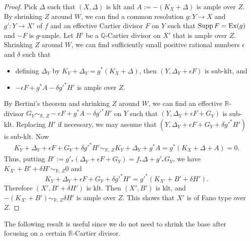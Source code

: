 \documentclass[12pt]{amsart}
\theoremstyle{definition}
\begin{document}
\begin{proof}
Pick $\Delta$ such that $(X,\Delta)$ is klt and $A:=-(K_{X}+\Delta)$ is ample over $Z$. 
By shrinking $Z$ around $W$, we can find a common resolution $g \colon Y \to X$ and $g' \colon Y \to X'$ of $f$ and an effective Cartier divisor $F$ on $Y$ such that ${\rm Supp}\,F={\rm Ex}(g)$ and $-F$ is $g$-ample. 
Let $H'$ be a $\mathbb{Q}$-Cartier divisor on $X'$ that is ample over $Z$. 
Shrinking $Z$ around $W$, we can find sufficiently small positive rational numbers $\epsilon$ and $\delta$ such that 
\begin{itemize}
\item
defining $\Delta_{Y}$ by $K_{Y}+\Delta_{Y}=g^{*}(K_{X}+\Delta)$, then $(Y,\Delta_{Y}+\epsilon F)$ is sub-klt, and 
\item
$-\epsilon F + g^{*}A-\delta g'^{*}H'$ is ample over $Z$. 
\end{itemize}
By Bertini's theorem and shrinking $Z$ around $W$, we can find an effective $\mathbb{R}$-divisor $G_{Y} \sim_{\mathbb{R},\,Z}-\epsilon F + g^{*}A-\delta g'^{*}H'$ on $Y$ such that $(Y,\Delta_{Y}+\epsilon F+G_{Y})$ is sub-klt. 
Replacing $H'$ if necessary, we may assume that $(Y,\Delta_{Y}+\epsilon F+G_{Y}+\delta g'^{*}H')$ is sub-klt. 
Now
\begin{equation*}
\begin{split}
K_{Y}+\Delta_{Y}+\epsilon F+G_{Y}+\delta g'^{*}H'\sim_{\mathbb{R},\,Z}K_{Y}+\Delta_{Y}+g^{*}A=g^{*}(K_{X}+\Delta+A) = 0.
\end{split}
\end{equation*}
Thus, putting $B':=g'_{*}(\Delta_{Y}+\epsilon F+G_{Y})=f_{*}\Delta+g'_{*}G_{Y}$, we have $K_{X'}+B'+\delta H' \sim_{\mathbb{R},\,Z}0$ and 
$$K_{Y}+\Delta_{Y}+\epsilon F+G_{Y}+\delta g'^{*}H'=g'^{*}(K_{X'}+B'+\delta H').$$ 
Therefore $(X',B'+\delta H')$ is klt. 
Then $(X',B')$ is klt, and $-(K_{X'}+B') \sim_{\mathbb{R},\,Z}\delta H'$ is ample over $Z$. 
This shows that $X'$ is of Fano type over $Z$. 
\end{proof}

The following result is useful since we do not need to shrink the base after focusing on a certain $\mathbb{R}$-Cartier divisor.
\end{document}
